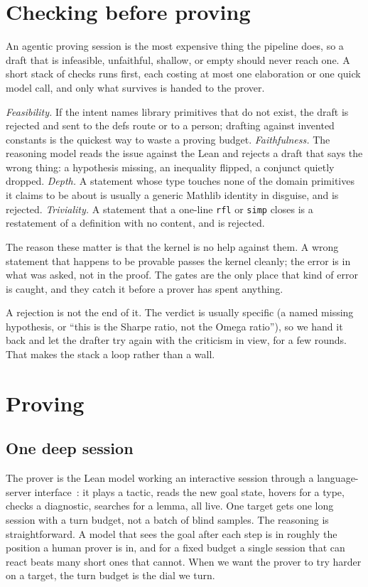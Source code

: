 \documentclass[11pt]{article}
\newcommand{\lean}[1]{\texttt{\def\_{\textunderscore\allowbreak}#1}}
\begin{document}
\section{Checking before proving}\label{sec:gates}

An agentic proving session is the most expensive thing the pipeline does, so a draft that
is infeasible, unfaithful, shallow, or empty should never reach one. A short stack of
checks runs first, each costing at most one elaboration or one quick model call, and only
what survives is handed to the prover.

\emph{Feasibility.} If the intent names library primitives that do not exist, the draft
is rejected and sent to the defs route or to a person; drafting against invented
constants is the quickest way to waste a proving budget. \emph{Faithfulness.} The
reasoning model reads the issue against the Lean and rejects a draft that says the wrong
thing: a hypothesis missing, an inequality flipped, a conjunct quietly dropped.
\emph{Depth.} A statement whose type touches none of the domain primitives it claims to
be about is usually a generic Mathlib identity in disguise, and is rejected.
\emph{Triviality.} A statement that a one-line \lean{rfl} or \lean{simp} closes is a
restatement of a definition with no content, and is rejected.

The reason these matter is that the kernel is no help against them. A wrong statement
that happens to be provable passes the kernel cleanly; the error is in what was asked,
not in the proof. The gates are the only place that kind of error is caught, and they
catch it before a prover has spent anything.

A rejection is not the end of it. The verdict is usually specific (a named missing
hypothesis, or ``this is the Sharpe ratio, not the Omega ratio''), so we hand it back and
let the drafter try again with the criticism in view, for a few rounds. That makes the
stack a loop rather than a wall.

\section{Proving}\label{sec:prove}

\subsection{One deep session}
The prover is the Lean model working an interactive session through a language-server
interface~\cite{leanlspmcp}: it plays a tactic, reads the new goal state, hovers for a
type, checks a diagnostic, searches for a lemma, all live. One target gets one long
session with a turn budget, not a batch of blind samples. The reasoning is
straightforward. A model that sees the goal after each step is in roughly the position a
human prover is in, and for a fixed budget a single session that can react beats many
short ones that cannot. When we want the prover to try harder on a target, the turn
budget is the dial we turn.
\end{document}
